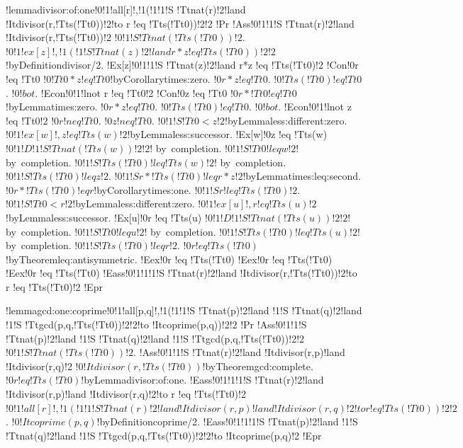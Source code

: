 !lemma{divisor:of:one}{!0!1!all[r]!,!1(!1!1!S !Tt{nat}(r)!2!land !It{divisor}(r,!Tt{s}(!Tt{0}))!2!to r !eq !Tt{s}(!Tt{0}))!2!2}
!Pr{
!Ass{!0!1!1!S !Tt{nat}(r)!2!land !It{divisor}(r,!Tt{s}(!Tt{0}))!2}
$!0!1!S !Tt{nat}(!Tt{s}(!Tt{0}))!2$.
$!0!1!ex[z]!,!1(!1!S !Tt{nat}(z)!2!land r*z !eq !Tt{s}(!Tt{0}))!2!2$!by{Definition}{divisor/2}.
!Ex[z]{!0!1!1!S !Tt{nat}(z)!2!land r*z !eq !Tt{s}(!Tt{0})!2}
!Con{!0r !eq !Tt{0}}
$!0!Tt{0}*z !eq !Tt{0}$!by{Corollary}{times:zero}.
$!0r*z !eq !Tt{0}$.
$!0!Tt{s}(!Tt{0}) !eq !Tt{0}$.
$!0!bot$.
!Econ{!0!1!lnot r !eq !Tt{0}!2}
!Con{!0z !eq !Tt{0}}
$!0r*!Tt{0} !eq !Tt{0}$!by{Lemma}{times:zero}.
$!0r*z !eq !Tt{0}$.
$!0!Tt{s}(!Tt{0}) !eq !Tt{0}$.
$!0!bot$.
!Econ{!0!1!lnot z !eq !Tt{0}!2}
$!0r !neq !Tt{0}$.
$!0z !neq !Tt{0}$.
$!0!1!S !Tt{0}<z!2$!by{Lemma}{less:different:zero}.
$!0!1!ex[w]!,z !eq !Tt{s}(w)!2$!by{Lemma}{less:successor}.
!Ex[w]{!0z !eq !Tt{s}(w)}
$!0!1!D !1!S !Tt{nat}(!Tt{s}(w))!2!2$! by~completion.
$!0!1!S !Tt{0} !leq w!2$! by~completion.
$!0!1!S !Tt{s}(!Tt{0}) !leq !Tt{s}(w)!2$! by~completion.
$!0!1!S !Tt{s}(!Tt{0}) !leq z!2$.
$!0!1!S r*!Tt{s}(!Tt{0}) !leq r*z!2$!by{Lemma}{times:leq:second}.
$!0r*!Tt{s}(!Tt{0}) !eq r$!by{Corollary}{times:one}.
$!0!1!S r !leq !Tt{s}(!Tt{0})!2$.
$!0!1!S !Tt{0}<r!2$!by{Lemma}{less:different:zero}.
$!0!1!ex[u]!,r !eq !Tt{s}(u)!2$!by{Lemma}{less:successor}.
!Ex[u]{!0r !eq !Tt{s}(u)}
$!0!1!D !1!S !Tt{nat}(!Tt{s}(u))!2!2$! by~completion.
$!0!1!S !Tt{0} !leq u!2$! by~completion.
$!0!1!S !Tt{s}(!Tt{0}) !leq !Tt{s}(u)!2$! by~completion.
$!0!1!S !Tt{s}(!Tt{0}) !leq r!2$.
$!0r !eq !Tt{s}(!Tt{0})$!by{Theorem}{leq:antisymmetric}.
!Eex{!0r !eq !Tt{s}(!Tt{0})}
!Eex{!0r !eq !Tt{s}(!Tt{0})}
!Eex{!0r !eq !Tt{s}(!Tt{0})}
!Eass{!0!1!1!1!S !Tt{nat}(r)!2!land !It{divisor}(r,!Tt{s}(!Tt{0}))!2!to r !eq !Tt{s}(!Tt{0})!2}}
!Epr

!lemma{gcd:one:coprime}{!0!1!all[p,q]!,!1(!1!1!S !Tt{nat}(p)!2!land !1!S !Tt{nat}(q)!2!land !1!S !Tt{gcd}(p,q,!Tt{s}(!Tt{0}))!2!2!to !It{coprime}(p,q))!2!2}
!Pr{
!Ass{!0!1!1!S !Tt{nat}(p)!2!land !1!S !Tt{nat}(q)!2!land !1!S !Tt{gcd}(p,q,!Tt{s}(!Tt{0}))!2!2}
$!0!1!S !Tt{nat}(!Tt{s}(!Tt{0}))!2$.
!Ass{!0!1!1!S !Tt{nat}(r)!2!land !It{divisor}(r,p)!land !It{divisor}(r,q)!2}
$!0!It{divisor}(r,!Tt{s}(!Tt{0}))$!by{Theorem}{gcd:complete}.
$!0r !eq !Tt{s}(!Tt{0})$!by{Lemma}{divisor:of:one}.
!Eass{!0!1!1!1!S !Tt{nat}(r)!2!land !It{divisor}(r,p)!land !It{divisor}(r,q)!2!to r !eq !Tt{s}(!Tt{0})!2}
$!0!1!all[r]!,!1(!1!1!S !Tt{nat}(r)!2!land !It{divisor}(r,p)!land !It{divisor}(r,q)!2!to r !eq !Tt{s}(!Tt{0}))!2!2$.
$!0!It{coprime}(p,q)$!by{Definition}{coprime/2}.
!Eass{!0!1!1!1!S !Tt{nat}(p)!2!land !1!S !Tt{nat}(q)!2!land !1!S !Tt{gcd}(p,q,!Tt{s}(!Tt{0}))!2!2!to !It{coprime}(p,q)!2}}
!Epr

